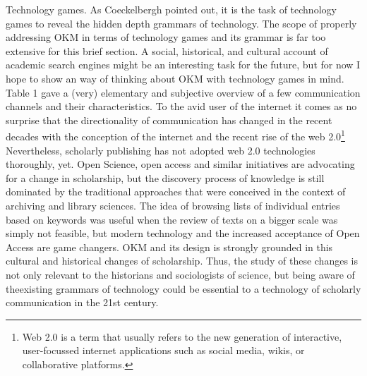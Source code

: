Technology games. As Coeckelbergh pointed out, it is the task of technology games to reveal the hidden depth grammars of technology. The scope of properly addressing OKM in terms of technology games and its
grammar is far too extensive for this brief section. A social,
historical, and cultural account of academic search engines might be an
interesting task for the future, but for now I hope to show an way of
thinking about OKM with technology games in mind. Table 1 gave a (very)
elementary and subjective overview of a few communication channels and
their characteristics. To the avid user of the internet it comes as no
surprise that the directionality of communication has changed in the
recent decades with the conception of the internet and the recent rise
of the web 2.0\footnote{Web 2.0 is a term that usually refers to the new
generation of interactive, user-focussed internet applications such as
social media, wikis, or collaborative platforms.} Nevertheless,
scholarly publishing has not adopted web 2.0 technologies thoroughly,
yet. Open Science, open access and similar initiatives are advocating
for a change in scholarship, but the discovery process of knowledge is
still dominated by the traditional approaches that were conceived in the
context of archiving and library sciences. The idea of browsing lists of
individual entries based on keywords was useful when the review of texts
on a bigger scale was simply not feasible, but modern technology and the
increased acceptance of Open Access are game changers. OKM and its
design is strongly grounded in this cultural and historical changes of
scholarship. Thus, the study of these changes is not only relevant to
the historians and sociologists of science, but being aware of theexisting grammars of technology could be essential to a technology of scholarly communication in the 21st century.